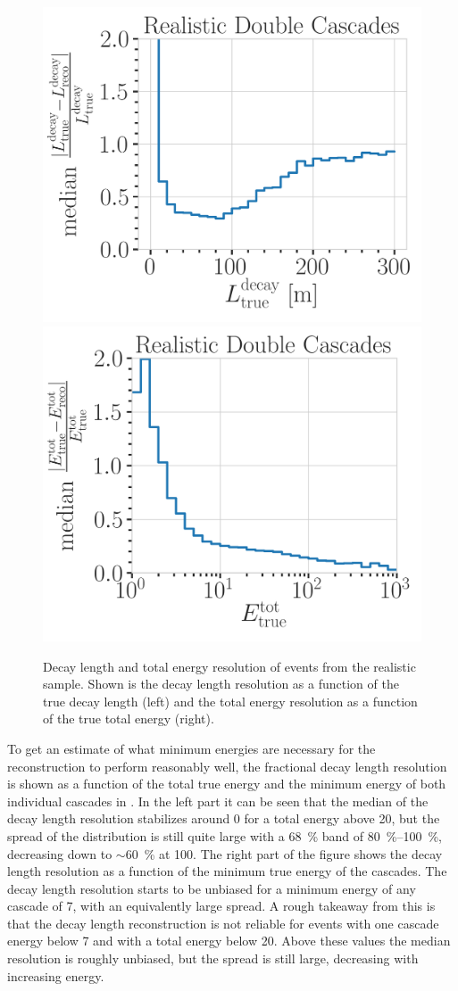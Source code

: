 \begin{figure}[h]
	\centering
    \includegraphics[width=0.45\linewidth]{figures/model_independent_simulation/results/realistic/resolutions/194603_median_decay_length_resolution_goodfit_log_unweighted.png}
    \includegraphics[width=0.45\linewidth]{figures/model_independent_simulation/results/realistic/resolutions/194603_median_absolute_fractional_reco_total_energy_error_goodfit.png} 
    \caption[Realistic double-cascade decay length and total energy resolution]{Decay length and total energy resolution of events from the realistic sample. Shown is the decay length resolution as a function of the true decay length (left) and the total energy resolution as a function of the true total energy (right).}
\end{figure}

To get an estimate of what minimum energies are necessary for the reconstruction to perform reasonably well, the fractional decay length resolution is shown as a function of the total true energy and the minimum energy of both individual cascades in . In the left part it can be seen that the median of the decay length resolution stabilizes around 0 for a total energy above \SI{20}{\gev}, but the spread of the distribution is still quite large with a \SI{68}{\percent} band of \SIrange{80}{100}{\percent}, decreasing down to $\sim$\SI{60}{\percent} at \SI{100}{\gev}. The right part of the figure shows the decay length resolution as a function of the minimum true energy of the cascades. The decay length resolution starts to be unbiased for a minimum energy of any cascade of \SI{7}{\gev}, with an equivalently large spread. A rough takeaway from this is that the decay length reconstruction is not reliable for events with one cascade energy below \SI{7}{\gev} and with a total energy below \SI{20}{\gev}. Above these values the median resolution is roughly unbiased, but the spread is still large, decreasing with increasing energy.

